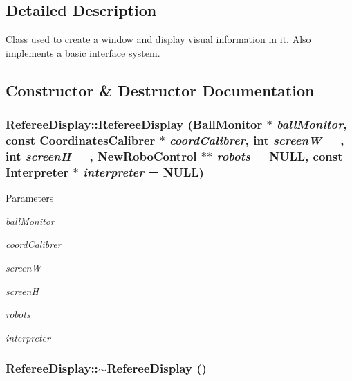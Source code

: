 \subsection{Detailed Description}
Class used to create a window and display visual information in it. Also implements a basic interface system. 

\subsection{Constructor \& Destructor Documentation}
\hypertarget{classRefereeDisplay_a8f7d4872a24b44b96a36a5bbf991f5d2}{
\subsubsection[{RefereeDisplay}]{\setlength{\rightskip}{0pt plus 5cm}RefereeDisplay::RefereeDisplay ({\bf BallMonitor} $\ast$ {\em ballMonitor}, \/  const {\bf CoordinatesCalibrer} $\ast$ {\em coordCalibrer}, \/  int {\em screenW} = {}, \/  int {\em screenH} = {}, \/  {\bf NewRoboControl} $\ast$$\ast$ {\em robots} = {\ttfamily NULL}, \/  const {\bf Interpreter} $\ast$ {\em interpreter} = {\ttfamily NULL})}}
\label{classRefereeDisplay_a8f7d4872a24b44b96a36a5bbf991f5d2}

\begin{DoxyParams}{Parameters}
\item[{\em ballMonitor}]\item[{\em coordCalibrer}]\item[{\em screenW}]\item[{\em screenH}]\item[{\em robots}]\item[{\em interpreter}]\end{DoxyParams}
\hypertarget{classRefereeDisplay_a5a9191c0d7f937df62ea9544d9e38f3b}{
\subsubsection[{$\sim$RefereeDisplay}]{\setlength{\rightskip}{0pt plus 5cm}RefereeDisplay::$\sim$RefereeDisplay ()}}
\label{classRefereeDisplay_a5a9191c0d7f937df62ea9544d9e38f3b}



